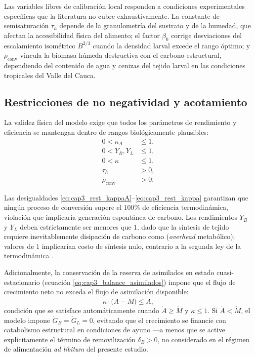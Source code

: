 Las variables libres de calibración local responden a condiciones experimentales específicas que la literatura no cubre exhaustivamente. La constante de semisaturación $\tau_h$ depende de la granulometría del sustrato y de la humedad, que afectan la accesibilidad física del alimento; el factor $\beta_0$ corrige desviaciones del escalamiento isométrico $B^{2/3}$ cuando la densidad larval excede el rango óptimo; y $\rho_{\mathrm{conv}}$ vincula la biomasa húmeda destructiva con el carbono estructural, dependiendo del contenido de agua y cenizas del tejido larval en las condiciones tropicales del Valle del Cauca.

\subsection{Restricciones de no negatividad y acotamiento}
\label{subsec:cap3_restricciones}

La validez física del modelo exige que todos los parámetros de rendimiento y eficiencia se mantengan dentro de rangos biológicamente plausibles:
\begin{align}
    0 < \kappa_A &\leq 1, \label{eq:cap3_rest_kappaA} \\
    0 < Y_B, Y_L &\leq 1, \label{eq:cap3_rest_rendimientos} \\
    0 < \kappa &\leq 1, \label{eq:cap3_rest_kappa} \\
    \tau_h &> 0, \label{eq:cap3_rest_tauh} \\
    \rho_{\mathrm{conv}} &> 0. \label{eq:cap3_rest_rhoconv}
\end{align}

Las desigualdades \eqref{eq:cap3_rest_kappaA}--\eqref{eq:cap3_rest_kappa} garantizan que ningún proceso de conversión supere el $100\%$ de eficiencia termodinámica, violación que implicaría generación espontánea de carbono. Los rendimientos $Y_B$ y $Y_L$ deben estrictamente ser menores que $1$, dado que la síntesis de tejido requiere inevitablemente disipación de carbono como  (\emph{overhead} metabólico); valores de $1$ implicarían costo de síntesis nulo, contrario a la segunda ley de la termodinámica \parencite{nielsenMetabolicPerformanceMealworms2025}.

Adicionalmente, la conservación de la reserva de asimilados en estado cuasi-estacionario (ecuación \eqref{eq:cap3_balance_asimilados}) impone que el flujo de crecimiento neto no exceda el flujo de asimilación disponible:
\begin{equation}
    \kappa \cdot \bigl(\dot{A} - \dot{M}\bigr) \leq \dot{A},
    \label{eq:cap3_rest_prioridad}
\end{equation}
condición que se satisface automáticamente cuando $\dot{A} \geq \dot{M}$ y $\kappa \leq 1$. Si $\dot{A} < \dot{M}$, el modelo impone $\dot{G}_B = \dot{G}_L = 0$, evitando que el crecimiento se financie con catabolismo estructural en condiciones de ayuno —a menos que se active explícitamente el término de removilización $\delta_B > 0$, no considerado en el régimen de alimentación \emph{ad libitum} del presente estudio.

